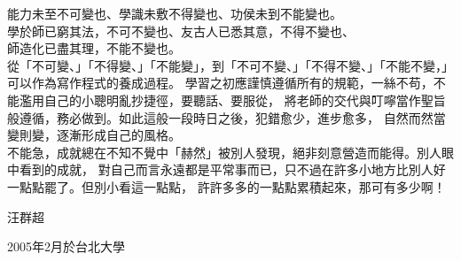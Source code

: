 {\MB 能力未至不可變也、學識未敷不得變也、功侯未到不能變也。\\
學於師已窮其法，不可不變也、友古人已悉其意，不得不變也、\\
師造化已盡其理，不能不變也。}\\

從「不可變、」「不得變、」「不能變」，到「不可不變、」「不得不變、」「不能不變，」可以作為寫作程式的養成過程。
學習之初應謹慎遵循所有的規範，一絲不苟，不能濫用自己的小聰明亂抄捷徑，要聽話、要服從，
將老師的交代與叮嚀當作聖旨般遵循，務必做到。如此這般一段時日之後，犯錯愈少，進步愈多，
自然而然當變則變，逐漸形成自己的風格。\\

不能急，成就總在不知不覺中「赫然」被別人發現，絕非刻意營造而能得。別人眼中看到的成就，
對自己而言永遠都是平常事而已，只不過在許多小地方比別人好一點點罷了。但別小看這一點點，
許許多多的一點點累積起來，那可有多少啊！

\begin{flushright}
    汪群超
    \par\vspace*{-2pt}\hfill 2005年2月於台北大學
\end{flushright}
